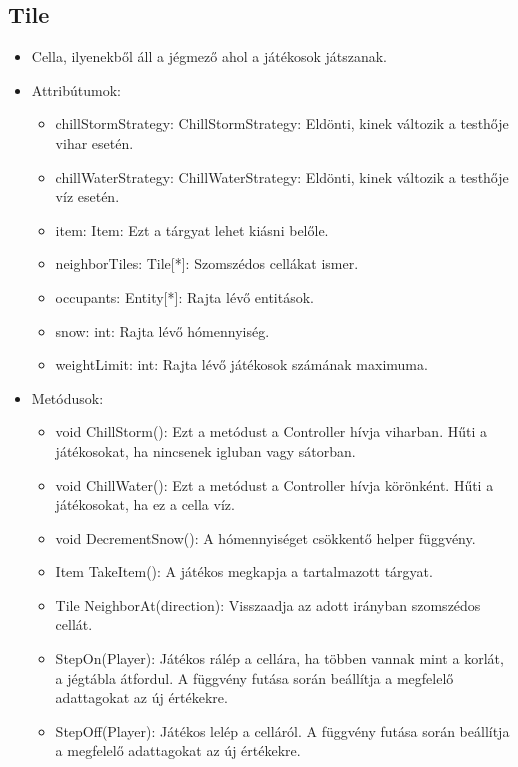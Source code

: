 \subsection{Tile}
\begin{itemize}
	\item Cella, ilyenekből áll a jégmező ahol a játékosok játszanak.
	\item Attribútumok:
	\begin{itemize}
		\item chillStormStrategy: ChillStormStrategy: Eldönti, kinek változik a testhője vihar esetén.
		\item chillWaterStrategy: ChillWaterStrategy: Eldönti, kinek változik a testhője víz esetén.
		\item item: Item: Ezt a tárgyat lehet kiásni belőle.
		\item neighborTiles: Tile[*]: Szomszédos cellákat ismer.
		\item occupants: Entity[*]: Rajta lévő entitások.
		\item snow: int: Rajta lévő hómennyiség.
		\item weightLimit: int: Rajta lévő játékosok számának maximuma.		
	\end{itemize}
	\item Metódusok:
	\begin{itemize}
		\item void ChillStorm(): Ezt a metódust a Controller hívja viharban. Hűti a játékosokat, ha nincsenek igluban vagy sátorban.
		\item void ChillWater(): Ezt a metódust a Controller hívja körönként. Hűti a játékosokat, ha ez a cella víz.
		\item void DecrementSnow(): A hómennyiséget csökkentő helper függvény.
		\item Item TakeItem(): A játékos megkapja a tartalmazott tárgyat.
		\item Tile NeighborAt(direction): Visszaadja az adott irányban szomszédos cellát.
		\item StepOn(Player): Játékos rálép a cellára, ha többen vannak mint a korlát, a jégtábla átfordul. A függvény futása során beállítja a megfelelő adattagokat az új értékekre.
		\item StepOff(Player): Játékos lelép a celláról. A függvény futása során beállítja a megfelelő adattagokat az új értékekre.
	\end{itemize}
\end{itemize}

